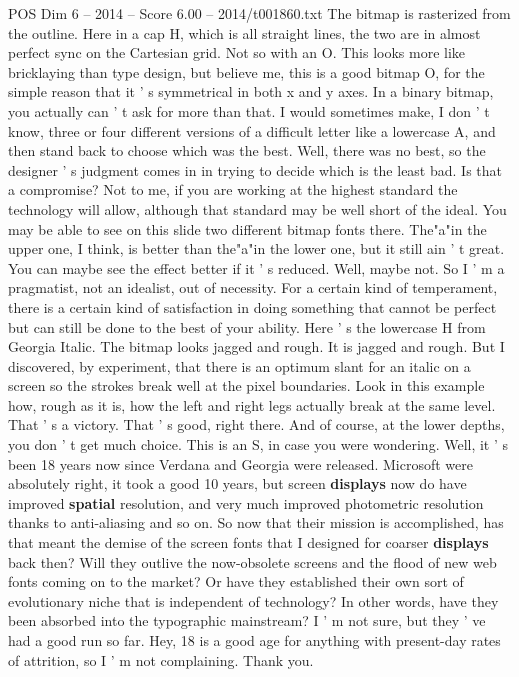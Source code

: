 \begin{textsample}{POS Dim 6 – 2014 – Score 6.00 – 2014/t001860.txt}
The bitmap is rasterized from the outline.
Here in a cap H, which is all straight lines, the two are in almost perfect sync on the Cartesian grid.
Not so with an O.
This looks more like bricklaying than type design, but believe me, this is a good bitmap O, for the simple reason that it ' s symmetrical in both x and y axes.
In a binary bitmap, you actually can ' t ask for more than that.
I would sometimes make, I don ' t know, three or four different versions of a difficult letter like a lowercase A, and then stand back to choose which was the best.
Well, there was no best, so the designer ' s judgment comes in in trying to decide which is the least bad.
Is that a compromise?
Not to me, if you are working at the highest standard the technology will allow, although that standard may be well short of the ideal.
You may be able to see on this slide two different bitmap fonts there.
The"a"in the upper one, I think, is better than the"a"in the lower one, but it still ain ' t great.
You can maybe see the effect better if it ' s reduced.
Well, maybe not.
So I ' m a pragmatist, not an idealist, out of necessity.
For a certain kind of temperament, there is a certain kind of satisfaction in doing something that cannot be perfect but can still be done to the best of your ability.
Here ' s the lowercase H from Georgia Italic.
The bitmap looks jagged and rough.
It is jagged and rough.
But I discovered, by experiment, that there is an optimum slant for an italic on a screen so the strokes break well at the pixel boundaries.
Look in this example how, rough as it is, how the left and right legs actually break at the same level.
That ' s a victory.
That ' s good, right there.
And of course, at the lower depths, you don ' t get much choice.
This is an S, in case you were wondering.
Well, it ' s been 18 years now since Verdana and Georgia were released.
Microsoft were absolutely right, it took a good 10 years, but screen \textbf{displays} now do have improved \textbf{spatial} resolution, and very much improved photometric resolution thanks to anti-aliasing and so on.
So now that their mission is accomplished, has that meant the demise of the screen fonts that I designed for coarser \textbf{displays} back then?
Will they outlive the now-obsolete screens and the flood of new web fonts coming on to the market?
Or have they established their own sort of evolutionary niche that is independent of technology?
In other words, have they been absorbed into the typographic mainstream?
I ' m not sure, but they ' ve had a good run so far.
Hey, 18 is a good age for anything with present-day rates of attrition, so I ' m not complaining.
Thank you.

\end{textsample}

